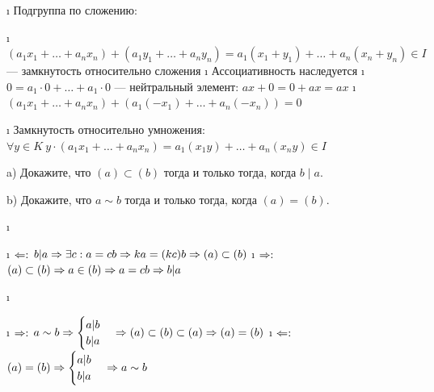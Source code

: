\begin{solution}
\begin{enumerate}
  \begin{enumerate}
  \def\labelenumii{\arabic{enumii}.}
  \tightlist
  \i
    Подгруппа по сложению:

    \begin{itemize}
    \tightlist
    \i
      \((a_1x_1+\dots+a_nx_n)+(a_1y_1+\dots+a_ny_n) = a_1(x_1+y_1)+\dots+a_n(x_n+y_n) \in I\) --- замкнутость относительно сложения
    \i
      Ассоциативность наследуется
    \i
      \(0 = a_1\cdot 0+\dots+a_1\cdot0\) --- нейтральный элемент: \(ax+0=0+ax=ax\)
    \i
      \((a_1x_1+\dots+a_nx_n)+(a_1(-x_1)+\dots+a_n(-x_n))=0\)
    \end{itemize}
  \i
    Замкнутость относительно умножения:
    \(\forall y \in K \ y\cdot (a_1x_1+\dots+a_nx_n) = a_1(x_1y)+\dots+a_n(x_ny) \in I\)
  \end{enumerate}
\end{enumerate}

\end{solution}

\begin{problem}[15(3.11)]
a) Докажите, что $(a) \subset (b)$ тогда и только тогда, когда $b \mid a$.

b) Докажите, что $a \sim b$ тогда и только тогда, когда $(a)=(b)$.
\end{problem}

\begin{solution}

\begin{enumerate}
\def\labelenumi{\alph{enumi})}
\i
  \begin{itemize}
  \tightlist
  \i
    \(\Leftarrow:\) \(b | a \Rightarrow \exists c: a=cb \Rightarrow ka=(kc)b \Rightarrow (a) \subset (b)\)
  \i
    \(\Rightarrow:\) \((a) \subset (b) \Rightarrow a \in (b) \Rightarrow a=cb \Rightarrow b|a\)
  \end{itemize}
\i
  \begin{itemize}
  \tightlist
  \i
    \(\Rightarrow:\) \(a \sim b \Rightarrow \begin{cases} a|b \\ b|a \end{cases} \Rightarrow (a) \subset (b) \subset (a) \Rightarrow (a) = (b)\)
  \i
    \(\Leftarrow:\) \((a) = (b) \Rightarrow \begin{cases} a|b \\ b|a \end{cases} \Rightarrow a \sim b\)
  \end{itemize}
\end{enumerate}

\end{solution}

